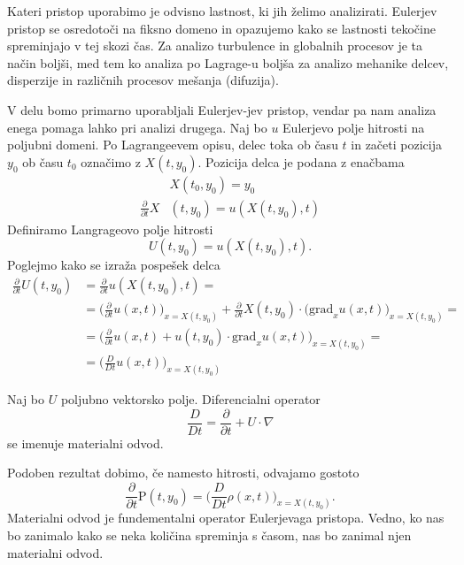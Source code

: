 \documentclass[mat2, tisk]{fmfdelo}
\begin{document}
Kateri pristop uporabimo je odvisno lastnost, ki jih želimo analizirati. Eulerjev pristop
se osredotoči na fiksno domeno in opazujemo kako se lastnosti tekočine spreminjajo v tej skozi čas. 
Za analizo turbulence in globalnih procesov je ta način boljši, med tem ko analiza po 
Lagrage-u boljša za analizo mehanike delcev, disperzije in različnih procesov mešanja (difuzija). 

V delu bomo primarno uporabljali Eulerjev-jev pristop, vendar pa nam analiza enega pomaga
lahko pri analizi drugega. Naj bo $u$ Eulerjevo polje hitrosti na poljubni domeni. Po Lagrangeevem 
opisu, delec toka ob času $t$ in začeti pozicija $y_0$ ob času $t_0$ označimo z $X(t, y_0)$.
Pozicija delca je podana z enačbama
\begin{align}
&X(t_0, y_0) = y_0 \\
\frac{\partial}{\partial t} X&(t, y_0) = u(X(t, y_0), t)
\end{align}
Definiramo Langrageovo polje hitrosti
\begin{equation}
U(t, y_0) = u(X(t, y_0), t).
\end{equation}
Poglejmo kako se izraža pospešek delca
\begin{align*}
\frac{\partial }{\partial t} U(t, y_0) &= \frac{\partial}{\partial t} u(X(t, y_0), t) = \\
&= \Big(\frac{\partial}{\partial t} u(x, t) \Big)_{x = X(t, y_0)} + \frac{\partial}{\partial t} X(t, y_0) \cdot \Big(\text{grad}_x u(x, t) \Big)_{x = X(t, y_0)} = \\
&= \Big(\frac{\partial}{\partial t} u(x, t) + u(t, y_0) \cdot \text{grad}_x u(x, t) \Big)_{x = X(t, y_0)} = \\
&= \Big(\frac{D}{Dt} u(x, t) \Big)_{x = X(t, y_0)}
\end{align*}
\begin{definicija}
Naj bo $U$ poljubno vektorsko polje. Diferencialni operator 
\begin{equation}
\frac{D}{Dt} = \frac{\partial}{\partial t} + U \cdot \nabla
\end{equation}
se imenuje materialni odvod.
\end{definicija}

Podoben rezultat dobimo, če namesto hitrosti, odvajamo gostoto
$$
\frac{\partial }{\partial t} \mathrm{P}(t, y_0) = \Big(\frac{D}{Dt} \rho(x, t) \Big)_{x = X(t, y_0)}.
$$
Materialni odvod je fundementalni operator Eulerjevaga pristopa. Vedno, ko nas bo 
zanimalo kako se neka količina spreminja s časom, nas bo zanimal njen materialni odvod.
\end{document}
